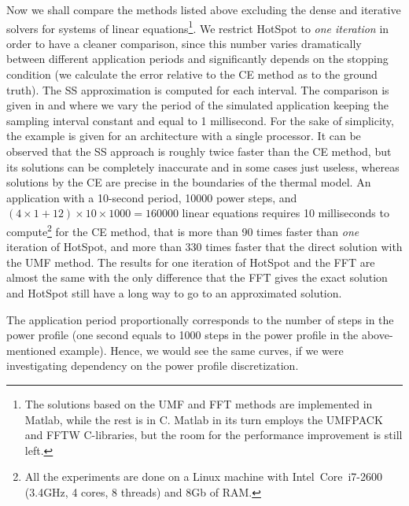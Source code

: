 Now we shall compare the methods listed above excluding the dense and iterative solvers for systems of linear equations\footnote{The solutions based on the UMF and FFT methods are implemented in Matlab, while the rest is in C. Matlab in its turn employs the UMFPACK and FFTW C-libraries, but the room for the performance improvement is still left.}. We restrict HotSpot to \emph{one iteration} in order to have a cleaner comparison, since this number varies dramatically between different application periods and significantly depends on the stopping condition (we calculate the error relative to the CE method as to the ground truth). The SS approximation is computed for each interval. The comparison is given in  and  where we vary the period of the simulated application keeping the sampling interval constant and equal to 1 millisecond. For the sake of simplicity, the example is given for an architecture with a single processor. It can be observed that the SS approach is roughly twice faster than the CE method, but its solutions can be completely inaccurate and in some cases just useless, whereas solutions by the CE are precise in the boundaries of the thermal model. An application with a 10-second period, 10000 power steps, and $(4 \times 1 + 12) \times 10 \times 1000 = 160000$ linear equations requires 10 milliseconds to compute\footnote{All the experiments are done on a Linux machine with Intel\textregistered\ Core\texttrademark\ i7-2600 (3.4GHz, 4 cores, 8 threads) and 8Gb of RAM.} for the CE method, that is more than 90 times faster than \emph{one} iteration of HotSpot, and more than 330 times faster that the direct solution with the UMF method. The results for one iteration of HotSpot and the FFT are almost the same with the only difference that the FFT gives the exact solution and HotSpot still have a long way to go to an approximated solution.

The application period proportionally corresponds to the number of steps in the power profile (one second equals to 1000 steps in the power profile in the above-mentioned example). Hence, we would see the same curves, if we were investigating dependency on the power profile discretization.

